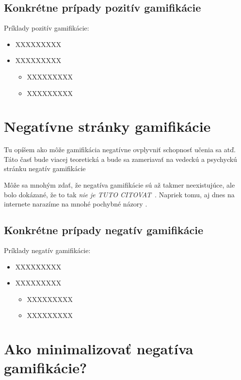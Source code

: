 \documentclass[10pt,twoside,slovak,a4paper]{article}
\begin{document}
\subsection{Konkrétne prípady pozitív gamifikácie} \label{PozitivnaPriklady}

Príklady pozitív gamifikácie:

\begin{itemize}
\item XXXXXXXXX
\item XXXXXXXXX
	\begin{itemize}
	\item XXXXXXXXX
	\item XXXXXXXXX
	\end{itemize}
\end{itemize}


\section{Negatívne stránky gamifikácie} \label{NegativnaGamifikacia}

Tu opíšem ako môže gamifikácia negatívne ovplyvniť schopnosť učenia sa atď.
Táto časť bude viacej teoretická a bude sa zameriavať na vedeckú a psychyckú stránku negatív gamifikácie

Môže sa mnohým zdať, že negatíva gamifikácie sú až takmer neexistujúce, ale bolo dokázané, že to tak \emph{nie je TUTO CITOVAT}~\cite{Czarnecki:Staged, Czarnecki:Progress}. Napriek tomu, aj dnes na internete narazíme na mnohé pochybné názory \cite{PLP-Framework}.


\subsection{Konkrétne prípady negatív gamifikácie} \label{NegativnePriklady}

Príklady negatív gamifikácie:

\begin{itemize}
\item XXXXXXXXX
\item XXXXXXXXX
	\begin{itemize}
	\item XXXXXXXXX
	\item XXXXXXXXX
	\end{itemize}
\end{itemize}


\section{Ako minimalizovať negatíva gamifikácie?} \label{MinimalizovanieNegatGamif}
\end{document}
